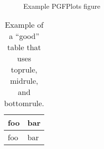 \begin{figure}[h]
  \centering 
  \caption{Example PGFPlots figure}
\end{figure}

\begin{table}
  \begin{tabular}{ll}
    \toprule
    foo & bar \\
    \midrule
    foo & bar \\
    \bottomrule
  \end{tabular}
  \caption[A ``good'' table]{Example of a ``good'' table that uses toprule, midrule, and bottomrule.}
\end{table}
